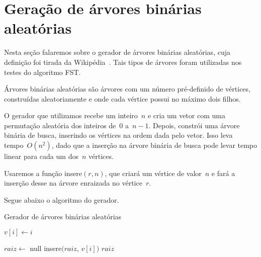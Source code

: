 \section {Geração de árvores binárias aleatórias}

Nesta seção falaremos sobre o gerador de árvores binárias 
aleatórias, cuja definição foi tirada
da Wikipédia~\cite{rbt}. Tais tipos de árvores foram utilizadas nos 
testes do algoritmo FST.

Árvores binárias aleatórias são árvores com um número 
pré-definido de vértices, construídas aleatoriamente e 
onde cada vértice possui no máximo dois filhos.

O gerador que utilizamos recebe um inteiro~$n$ e cria um vetor
com uma permutação aleatória dos inteiros de~$0$ a~$n-1$.
Depois, constrói uma árvore binária de busca, inserindo 
os vértices na ordem dada pelo vetor.
Isso leva tempo~$O(n^2)$, dado que a inserção na árvore 
binária de busca pode levar tempo linear para cada um dos~$n$ 
vértices.

Usaremos a função {\sc insere}$(r, n)$, que criará
um vértice de valor~$n$ e fará a inserção desse na árvore
enraizada no vértice~$r$.

Segue abaixo o algoritmo do gerador.

\begin{algorithm}[H]
\label{alg:ABAgenerator}

	\caption{Gerador de árvores binárias aleatórias}
	{
		$v[i] \gets i$\;
	}

	$raiz\gets$ {\sc null}\;
	{
		{\sc insere}$(raiz$, $v[i])$\;
	}
	\Return $raiz$\;

\end{algorithm}	

\bigskip
\bigskip

